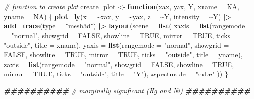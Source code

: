 \documentclass[12pt, twoside]{amherstthesis}
\newenvironment{Shaded}{\begin{snugshade}}{\end{snugshade}}
\newcommand{\AttributeTok}[1]{\textcolor[rgb]{0.13,0.29,0.53}{#1}}
\newcommand{\CommentTok}[1]{\textcolor[rgb]{0.56,0.35,0.01}{\textit{#1}}}
\newcommand{\ConstantTok}[1]{\textcolor[rgb]{0.56,0.35,0.01}{#1}}
\newcommand{\ControlFlowTok}[1]{\textcolor[rgb]{0.13,0.29,0.53}{\textbf{#1}}}
\newcommand{\DocumentationTok}[1]{\textcolor[rgb]{0.56,0.35,0.01}{\textbf{\textit{#1}}}}
\newcommand{\FunctionTok}[1]{\textcolor[rgb]{0.13,0.29,0.53}{\textbf{#1}}}
\newcommand{\NormalTok}[1]{#1}
\newcommand{\OtherTok}[1]{\textcolor[rgb]{0.56,0.35,0.01}{#1}}
\newcommand{\SpecialCharTok}[1]{\textcolor[rgb]{0.81,0.36,0.00}{\textbf{#1}}}
\newcommand{\StringTok}[1]{\textcolor[rgb]{0.31,0.60,0.02}{#1}}
\begin{document}
\begin{Shaded}
\begin{Highlighting}[]
\CommentTok{\# function to create plot}
\NormalTok{create\_plot }\OtherTok{\textless{}{-}} \ControlFlowTok{function}\NormalTok{(xax, yax, Y, }\AttributeTok{xname =} \ConstantTok{NA}\NormalTok{, }\AttributeTok{yname =} \ConstantTok{NA}\NormalTok{) \{}
  \FunctionTok{plot\_ly}\NormalTok{(}\AttributeTok{x =} \SpecialCharTok{\textasciitilde{}}\NormalTok{xax, }\AttributeTok{y =} \SpecialCharTok{\textasciitilde{}}\NormalTok{yax, }\AttributeTok{z =} \SpecialCharTok{\textasciitilde{}}\NormalTok{Y, }\AttributeTok{intensity =} \SpecialCharTok{\textasciitilde{}}\NormalTok{Y) }\SpecialCharTok{|\textgreater{}} 
    \FunctionTok{add\_trace}\NormalTok{(}\AttributeTok{type =} \StringTok{"mesh3d"}\NormalTok{) }\SpecialCharTok{|\textgreater{}} 
    \FunctionTok{layout}\NormalTok{(}\AttributeTok{scene =} \FunctionTok{list}\NormalTok{(}
      \AttributeTok{xaxis =} \FunctionTok{list}\NormalTok{(}\AttributeTok{rangemode =} \StringTok{"normal"}\NormalTok{,}
                   \AttributeTok{showgrid =} \ConstantTok{FALSE}\NormalTok{,}
                   \AttributeTok{showline =} \ConstantTok{TRUE}\NormalTok{, }
                   \AttributeTok{mirror =} \ConstantTok{TRUE}\NormalTok{, }
                   \AttributeTok{ticks =} \StringTok{"outside"}\NormalTok{, }
                   \AttributeTok{title =}\NormalTok{ xname), }
      \AttributeTok{yaxis =} \FunctionTok{list}\NormalTok{(}\AttributeTok{rangemode =} \StringTok{"normal"}\NormalTok{, }
                   \AttributeTok{showgrid =} \ConstantTok{FALSE}\NormalTok{,}
                   \AttributeTok{showline =} \ConstantTok{TRUE}\NormalTok{, }
                   \AttributeTok{mirror =} \ConstantTok{TRUE}\NormalTok{, }
                   \AttributeTok{ticks =} \StringTok{"outside"}\NormalTok{, }
                   \AttributeTok{title =}\NormalTok{ yname), }
      \AttributeTok{zaxis =} \FunctionTok{list}\NormalTok{(}\AttributeTok{rangemode =} \StringTok{"normal"}\NormalTok{, }
                   \AttributeTok{showgrid =} \ConstantTok{FALSE}\NormalTok{,}
                   \AttributeTok{showline =} \ConstantTok{TRUE}\NormalTok{, }
                   \AttributeTok{mirror =} \ConstantTok{TRUE}\NormalTok{, }
                   \AttributeTok{ticks =} \StringTok{"outside"}\NormalTok{, }
                   \AttributeTok{title =} \StringTok{"Y"}\NormalTok{), }
      \AttributeTok{aspectmode =} \StringTok{"cube"}
\NormalTok{    ))}
\NormalTok{\}}

\DocumentationTok{\#\#\#\#\#\#\#\#\#\#}
\CommentTok{\# marginally significant (Hg and Ni)}
\DocumentationTok{\#\#\#\#\#\#\#\#\#\#}


\end{Highlighting}
\end{Shaded}
\end{document}
